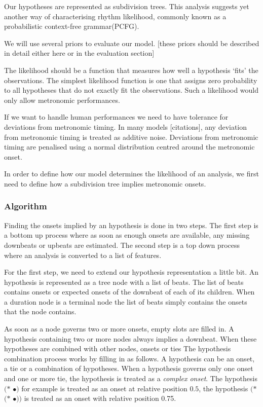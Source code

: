 Our hypotheses are represented as subdivision trees. This analysis suggests yet another way of characterising rhythm likelihood, commonly known as a probabilistic context-free grammar(PCFG). 

We will use several priors to evaluate our model. [these priors should be described in detail either here or in the evaluation section]

The likelihood should be a function that measures how well a hypothesis `fits' the observations. The simplest likelihood function is one that assigns zero probability to all hypotheses that do not exactly fit the observations. Such a likelihood would only allow metronomic performances. 

If we want to handle human performances we need to have tolerance for deviations from metronomic timing. In many models [citations], any deviation from metronomic timing is treated as additive noise. Deviations from metronomic timing are penalised using a normal distribution centred around the metronomic onset.

In order to define how our model determines the likelihood of an analysis, we first need to define how a subdivision tree implies metronomic onsets. 


\subsubsection{Algorithm}

Finding the onsets implied by an hypothesis is done in two steps. The first step is a bottom up process where as soon as enough onsets are available, any missing downbeats or upbeats are estimated. The second step is a top down process where an analysis is converted to a list of features.

For the first step, we need to extend our hypothesis representation a little bit. 
An hypothesis is represented as a tree node with a list of beats. The list of beats contains onsets or expected onsets of the downbeat of each of its children. When a duration node is a terminal node the list of beats simply contains the onsets that the node contains.

As soon as a node governs two or more onsets, empty slots are filled in. A hypothesis containing two or more nodes always implies a downbeat. When these hypotheses are combined with other nodes, onsets or ties
The hypothesis combination process works by filling in as follows. A hypothesis can be an onset, a tie or a combination of hypotheses. When a hypothesis governs only one onset and one or more tie, the hypothesis is treated as a \textit{complex onset}. The hypothesis $(*$ $\bullet)$ for example is treated as an onset at relative position $0.5$, the hypothesis $(*$ $(*$ $\bullet))$ is treated as an onset with relative position 0.75.

